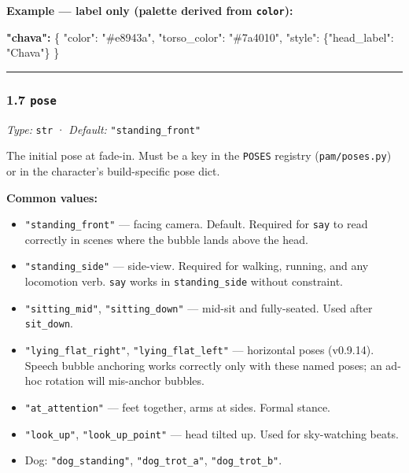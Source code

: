 \documentclass[
  11pt,
]{book}
\newenvironment{Shaded}{}{}
\newcommand{\DataTypeTok}[1]{\textcolor[rgb]{0.56,0.13,0.00}{#1}}
\newcommand{\ErrorTok}[1]{\textcolor[rgb]{1.00,0.00,0.00}{\textbf{#1}}}
\newcommand{\FunctionTok}[1]{\textcolor[rgb]{0.02,0.16,0.49}{#1}}
\newcommand{\StringTok}[1]{\textcolor[rgb]{0.25,0.44,0.63}{#1}}
\providecommand{\tightlist}{%
  \setlength{\itemsep}{0pt}\setlength{\parskip}{0pt}}
\begin{document}
\textbf{Example --- label only (palette derived from \texttt{color}):}

\begin{Shaded}
\begin{Highlighting}[]
\ErrorTok{"chava":} \FunctionTok{\{}
  \DataTypeTok{"color"}\FunctionTok{:} \StringTok{"\#e8943a"}\FunctionTok{,}
  \DataTypeTok{"torso\_color"}\FunctionTok{:} \StringTok{"\#7a4010"}\FunctionTok{,}
  \DataTypeTok{"style"}\FunctionTok{:} \FunctionTok{\{}\DataTypeTok{"head\_label"}\FunctionTok{:} \StringTok{"Chava"}\FunctionTok{\}}
\FunctionTok{\}}
\end{Highlighting}
\end{Shaded}

\begin{center}\rule{0.5\linewidth}{0.5pt}\end{center}

\subsubsection{\texorpdfstring{1.7 \texttt{pose}}{1.7 pose}}\label{pose}

\emph{Type:} \texttt{str} · \emph{Default:} \texttt{"standing\_front"}

The initial pose at fade-in. Must be a key in the \texttt{POSES}
registry (\texttt{pam/poses.py}) or in the character's build-specific
pose dict.

\textbf{Common values:}

\begin{itemize}
\tightlist
\item
  \texttt{"standing\_front"} --- facing camera. Default. Required for
  \texttt{say} to read correctly in scenes where the bubble lands above
  the head.
\item
  \texttt{"standing\_side"} --- side-view. Required for walking,
  running, and any locomotion verb. \texttt{say} works in
  \texttt{standing\_side} without constraint.
\item
  \texttt{"sitting\_mid"}, \texttt{"sitting\_down"} --- mid-sit and
  fully-seated. Used after \texttt{sit\_down}.
\item
  \texttt{"lying\_flat\_right"}, \texttt{"lying\_flat\_left"} ---
  horizontal poses (v0.9.14). Speech bubble anchoring works correctly
  only with these named poses; an ad-hoc rotation will mis-anchor
  bubbles.
\item
  \texttt{"at\_attention"} --- feet together, arms at sides. Formal
  stance.
\item
  \texttt{"look\_up"}, \texttt{"look\_up\_point"} --- head tilted up.
  Used for sky-watching beats.
\item
  Dog: \texttt{"dog\_standing"}, \texttt{"dog\_trot\_a"},
  \texttt{"dog\_trot\_b"}.
\end{itemize}
\end{document}

